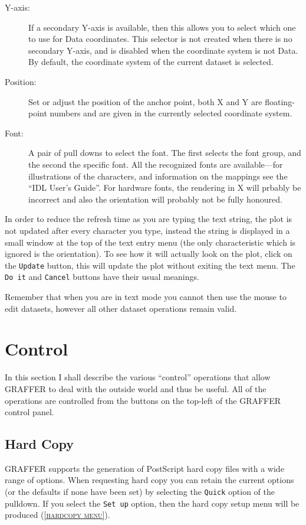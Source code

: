 \documentclass[11pt,twoside,english]{article}
\begin{document}
\begin{description}
\item[Y-axis:] If a secondary Y-axis is available, then this allows you
  to select which one to use for Data coordinates. This selector is not
  created when there is no secondary Y-axis, and is disabled when the
  coordinate system is not Data. By default, the coordinate system of
  the current dataset is selected.
\item [Position:]Set or adjust the position of the anchor point, both X
  and Y are floating-point numbers and are given in the currently
  selected coordinate system.
\item [Font:] A pair of pull downs to select the font. The first
  selects the font group, and the second the specific font. All the
  recognized fonts are available---for illustrations of the characters,
  and information on the mappings see the ``IDL User's Guide''. For
  hardware fonts, the rendering in X will prbably be incorrect and also
  the orientation will probably not be fully honoured.
\end{description}
In order to reduce the refresh time as you are typing the text string,
the plot is not updated after every character you type, instead the
string is displayed in a small window at the top of the text entry menu
(the only characteristic which is ignored is the orientation).  To see
how it will actually look on the plot, click on the \texttt{Update}
button, this will update the plot without exiting the text menu. The
\texttt{Do it} and \texttt{Cancel} buttons have their usual meanings.

Remember that when you are in text mode you cannot then use the mouse
to edit datasets, however all other dataset operations remain valid.


\section{Control}

In this section I shall describe the various {}``control'' operations
that allow GRAFFER to deal with the outside world and thus be useful.
All of the operations are controlled from the buttons on the top-left
of the GRAFFER control panel.


\subsection{Hard Copy}

GRAFFER supports the generation of PostScript hard copy files with a
wide range of options. When requesting hard copy you can retain the
current options (or the defaults if none have been set) by selecting
the \texttt{Quick} option of the pulldown. If you select the
\texttt{Set up} option, then the hard copy setup menu will be produced
(\textsc{\autoref{hardcopy menu}}).
\end{document}
